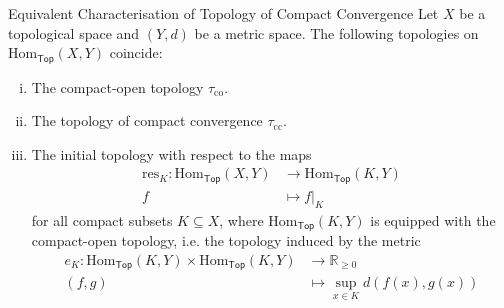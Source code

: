 \documentclass{report}
\begin{document}
\begin{proposition}{Equivalent Characterisation of Topology of Compact Convergence}{}
	Let $X$ be a topological space and $(Y,d)$ be a metric space. The following topologies on $\mathrm{Hom}_{\mathsf{Top}}(X,Y)$ coincide:
	\begin{enumerate}[(i)]
		\item The compact-open topology $\tau_{\mathrm{co}}$.
		\item The topology of compact convergence $\tau_{\mathrm{cc}}$.
		\item The initial topology with respect to the maps
	\begin{align*}
		\mathrm{res}_K: \mathrm{Hom}_{\mathsf{Top}}(X,Y) &\longrightarrow \mathrm{Hom}_{\mathsf{Top}}(K,Y)\\
		f &\longmapsto f|_K
	\end{align*}
	for all compact subsets $K \subseteq X$, where $\mathrm{Hom}_{\mathsf{Top}}(K,Y)$ is equipped with the compact-open topology, i.e. the topology induced by the metric
	\begin{align*}
		e_K: \mathrm{Hom}_{\mathsf{Top}}(K,Y)\times\mathrm{Hom}_{\mathsf{Top}}(K,Y) &\longrightarrow \mathbb{R}_{\ge 0} \\
		(f,g) &\longmapsto \sup_{x \in K} d\left(f(x),g(x)\right)
	\end{align*}
	\end{enumerate}
\end{proposition}
\end{document}
